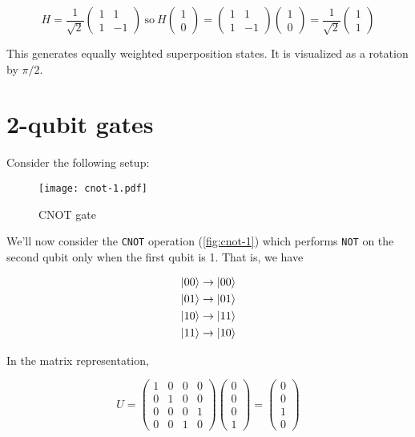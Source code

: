 \documentclass[12pt, english]{book}
\begin{document}
\[ H = \frac{1}{\sqrt{2}} \begin{pmatrix} 1 & 1 \\ 1 & -1 \end{pmatrix}\ \text{so}\ H \begin{pmatrix} 1 \\ 0 \end{pmatrix} = \begin{pmatrix} 1 & 1 \\ 1 & -1 \end{pmatrix} \begin{pmatrix} 1 \\ 0 \end{pmatrix} = \frac{1}{\sqrt{2}} \begin{pmatrix} 1 \\ 1 \end{pmatrix} \]

This generates equally weighted superposition states.
It is visualized as a rotation by $\pi/2$.

\section{2-qubit gates}

Consider the following setup:

\begin{figure}[!ht]
	\centering
	\texttt{[image: cnot-1.pdf]}
	\caption{CNOT gate}
	\label{fig:cnot-1}
\end{figure}

We'll now consider the \texttt{CNOT} operation (\autoref{fig:cnot-1}) which performs \texttt{NOT} on the second qubit only when the first qubit is 1.
That is, we have

\begin{align*}
	\ket{00} &\rightarrow \ket{00} \\
	\ket{01} &\rightarrow \ket{01} \\
	\ket{10} &\rightarrow \ket{11} \\
	\ket{11} &\rightarrow \ket{10} 
\end{align*}

In the matrix representation,

\[ U = \begin{pmatrix} 1 & 0 & 0 & 0 \\ 0 & 1 & 0 & 0 \\ 0 & 0 & 0 & 1 \\ 0 & 0 & 1 & 0 \end{pmatrix} \begin{pmatrix} 0 \\ 0 \\ 0 \\ 1 \end{pmatrix} = \begin{pmatrix} 0 \\ 0 \\ 1 \\ 0 \end{pmatrix} \]
\end{document}
